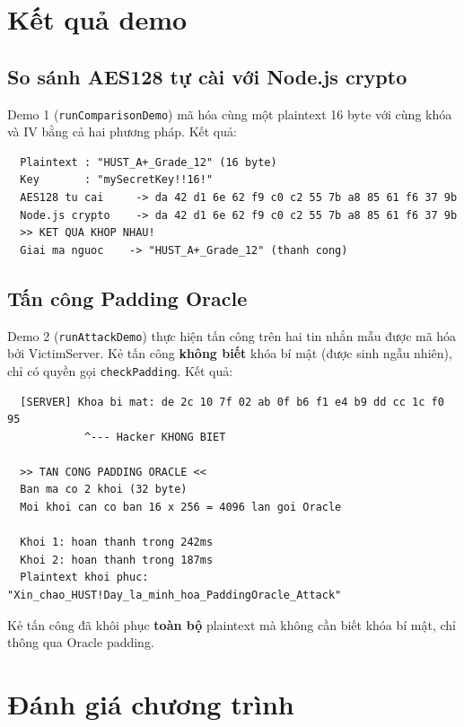 \section{Kết quả demo}
\label{sec:demo-results}

\subsection{So sánh AES128 tự cài với Node.js crypto}

Demo 1 (\texttt{runComparisonDemo}) mã hóa cùng một plaintext 16 byte với cùng khóa và IV bằng cả hai phương pháp. Kết quả:

\begin{verbatim}
  Plaintext : "HUST_A+_Grade_12" (16 byte)
  Key       : "mySecretKey!!16!"
  AES128 tu cai     -> da 42 d1 6e 62 f9 c0 c2 55 7b a8 85 61 f6 37 9b
  Node.js crypto    -> da 42 d1 6e 62 f9 c0 c2 55 7b a8 85 61 f6 37 9b
  >> KET QUA KHOP NHAU!
  Giai ma nguoc    -> "HUST_A+_Grade_12" (thanh cong)
\end{verbatim}

\subsection{Tấn công Padding Oracle}

Demo 2 (\texttt{runAttackDemo}) thực hiện tấn công trên hai tin nhắn mẫu được mã hóa bởi VictimServer. Kẻ tấn công \textbf{không biết} khóa bí mật (được sinh ngẫu nhiên), chỉ có quyền gọi \texttt{checkPadding}. Kết quả:

\begin{verbatim}
  [SERVER] Khoa bi mat: de 2c 10 7f 02 ab 0f b6 f1 e4 b9 dd cc 1c f0 95
            ^--- Hacker KHONG BIET

  >> TAN CONG PADDING ORACLE <<
  Ban ma co 2 khoi (32 byte)
  Moi khoi can co ban 16 x 256 = 4096 lan goi Oracle

  Khoi 1: hoan thanh trong 242ms
  Khoi 2: hoan thanh trong 187ms
  Plaintext khoi phuc: "Xin_chao_HUST!Day_la_minh_hoa_PaddingOracle_Attack"
\end{verbatim}

Kẻ tấn công đã khôi phục \textbf{toàn bộ} plaintext mà không cần biết khóa bí mật, chỉ thông qua Oracle padding.

\section{Đánh giá chương trình}
\label{sec:evaluation}

